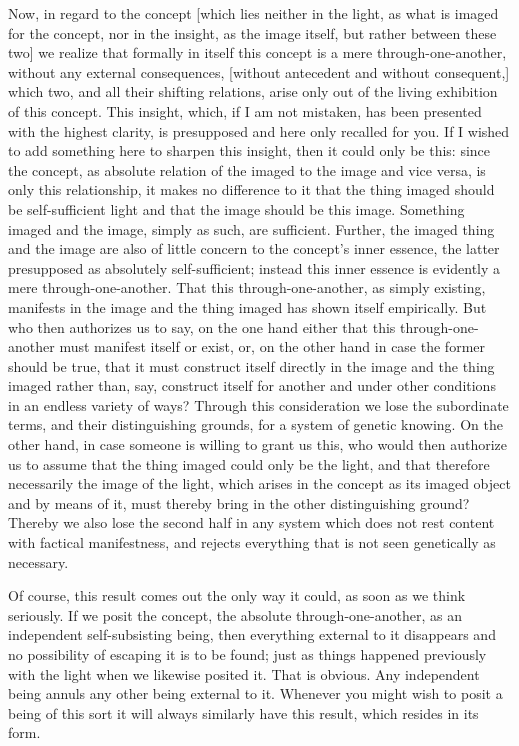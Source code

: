 Now, in regard to the concept
[which lies neither in the light,
as what is imaged for the concept,
nor in the insight, as the image itself,
but rather between these two]
we realize that formally in itself
this concept is a mere through-one-another,
without any external consequences,
[without antecedent and without consequent,]
which two, and all their shifting relations,
arise only out of the living exhibition of this concept.
This insight, which, if I am not mistaken,
has been presented with the highest clarity,
is presupposed and here only recalled for you.
If I wished to add something here
to sharpen this insight,
then it could only be this:
since the concept, as absolute relation of
the imaged to the image and vice versa,
is only this relationship,
it makes no difference to it that
the thing imaged should be self-sufficient light
and that the image should be this image.
Something imaged and the image,
simply as such, are sufficient.
Further, the imaged thing and the image are
also of little concern to the concept’s inner essence,
the latter presupposed as absolutely self-sufficient;
instead this inner essence is
evidently a mere through-one-another.
That this through-one-another, as simply existing,
manifests in the image and the thing imaged
has shown itself empirically.
But who then authorizes us to say,
on the one hand either that this
through-one-another must manifest itself or exist,
or, on the other hand in case the former should be true,
that it must construct itself directly
in the image and the thing imaged
rather than, say, construct itself
for another and under other conditions
in an endless variety of ways?
Through this consideration
we lose the subordinate terms,
and their distinguishing grounds,
for a system of genetic knowing.
On the other hand, in case someone is
willing to grant us this,
who would then authorize us
to assume that the thing imaged
could only be the light,
and that therefore necessarily
the image of the light,
which arises in the concept
as its imaged object and by means of it,
must thereby bring in the other distinguishing ground?
Thereby we also lose the second half in any system
which does not rest content with factical manifestness,
and rejects everything that is not
seen genetically as necessary.

Of course, this result comes out the only way it could,
as soon as we think seriously.
If we posit the concept, the absolute through-one-another,
as an independent self-subsisting being,
then everything external to it disappears
and no possibility of escaping it is to be found;
just as things happened previously
with the light when we likewise posited it.
That is obvious.
Any independent being annuls any other being external to it.
Whenever you might wish to posit a being of this sort
it will always similarly have this result,
which resides in its form.

